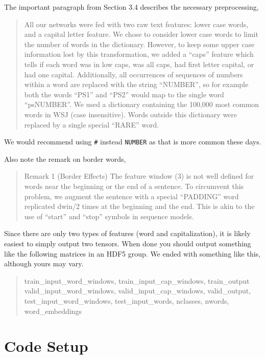 \documentclass[11pt]{article}
\begin{document}
The important paragraph from Section 3.4 describes the necessary
preprocessing,

\begin{quote}
  All our networks were fed with two raw text features: lower case
  words, and a capital letter feature. We chose to consider lower case
  words to limit the number of words in the dictionary. However, to
  keep some upper case information lost by this transformation, we
  added a “caps” feature which tells if each word was in low caps, was
  all caps, had first letter capital, or had one
  capital. Additionally, all occurrences of sequences of numbers
  within a word are replaced with the string “NUMBER”, so for example
  both the words “PS1” and “PS2” would map to the single word
  “psNUMBER”. We used a dictionary containing the 100,000 most common
  words in WSJ (case insensitive). Words outside this dictionary were
  replaced by a single special “RARE” word.
\end{quote}


We would recommend using \texttt{\#} instead \texttt{NUMBER} as that is more 
common these days.  

Also note the remark on border words, 

\begin{quote}
Remark 1 (Border Effects) The feature window (3) is not well defined for words near
the beginning or the end of a sentence. To circumvent this problem, we augment the sentence
with a special “PADDING” word replicated dwin/2 times at the beginning and the end. This
is akin to the use of “start” and “stop” symbols in sequence models.
\end{quote}

Since there are only two types of features (word and capitalization),
it is likely easiest to simply output two tensors. When done you
should output something like the following matrices in an HDF5
group. We ended with something like this, although yours may vary.

\begin{quote}
  train\_input\_word\_windows, train\_input\_cap\_windows,
  train\_output valid\_input\_word\_windows,
  valid\_input\_cap\_windows, valid\_output,
  test\_input\_word\_windows, test\_input\_words, nclasses, nwords,
  word\_embeddings
\end{quote}

\section{Code Setup}
\end{document}
